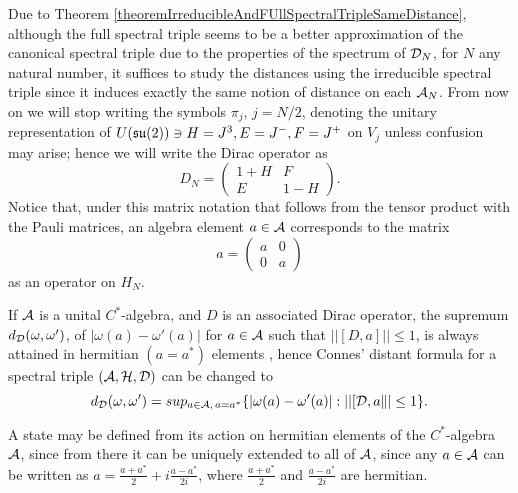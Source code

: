 Due to Theorem \ref{theoremIrreducibleAndFUllSpectralTripleSameDistance}, although the full spectral triple seems to be a better approximation of the canonical spectral triple due to the properties of the spectrum of $\mathcal D_N$, for $N$ any natural number, it suffices to study the distances using the irreducible spectral triple since it induces exactly the same notion of distance on each $\mathcal A_N$. From now on we will stop writing the symbols $\pi_j$, $j = N/2$, denoting the unitary representation of $U(\mathfrak{su}(2)) \ni H = J^3, E = J^-, F = J^+$ on $V_j$ unless confusion may arise; hence we will write the Dirac operator as
\begin{equation}
    D_N = \begin{pmatrix} 1 + H & F \\ E & 1 - H\end{pmatrix}.
\end{equation}
Notice that, under this matrix notation that follows from the tensor product with the Pauli matrices, an algebra element $a \in \mathcal A$ corresponds to the matrix
\begin{equation}\label{aAsMatrixOperator}
    a = \begin{pmatrix} a & 0 \\ 0 & a \end{pmatrix}
\end{equation} as an operator on $H_N$.

\begin{remark}
If $\mathcal A$ is a unital $C^*$-algebra, and $D$ is an associated Dirac operator, the supremum  $d_\mathcal D(\omega, \omega')$, of $|\omega(a) - \omega'(a)|$ for $a \in \mathcal A$ such that $||[D, a]|| \leq 1$, is always attained in hermitian $(a = a^*)$ elements \cite{Iochum2001}, hence Connes' distant formula for a spectral triple $(\mathcal A, \mathcal H, \mathcal D)$ can be changed to
\begin{equation} \label{distanceFormulaHermitian}
    d_\mathcal D(\omega, \omega') = sup_{a \in \mathcal A, \,a = a^*} \{|\omega(a) - \omega'(a)| : ||[\mathcal D, a\|| \leq 1\}.
\end{equation}
\end{remark}

\begin{remark}
A state may be defined from its action on hermitian elements of the $C^*$-algebra $\mathcal A$, since from there it can be uniquely extended to all of $\mathcal A$, since any $a \in \mathcal A$ can be written as $a = \frac{a+a^*}{2} + i \frac{a - a^*}{2i}$, where $\frac{a+a^*}{2}$ and $\frac{a-a^*}{2i}$ are hermitian.
\end{remark}

